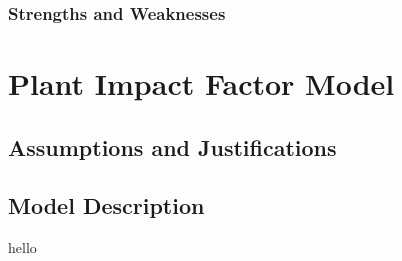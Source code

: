 \documentclass[12pt]{article}
\begin{document}
			
			
		\subsubsection{Strengths and Weaknesses}
		
		

		
		
		
		
\section{Plant Impact Factor Model}

	\subsection{Assumptions and Justifications}
	
	\subsection{Model Description}

		hello
		
\end{document}
